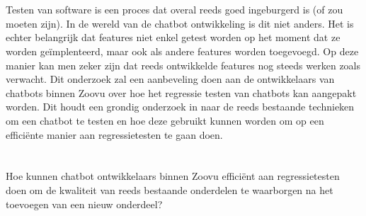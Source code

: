 \section{}
\label{sec:probleemstelling}


Testen van software is een proces dat overal reeds goed ingeburgerd is (of zou moeten zijn). In de wereld van de chatbot ontwikkeling is dit niet anders. Het is echter belangrijk dat features niet enkel getest worden op het moment dat ze worden geïmplenteerd, maar ook als andere features worden toegevoegd. Op deze manier kan men zeker zijn dat reeds ontwikkelde features nog steeds werken zoals verwacht. Dit onderzoek zal een aanbeveling doen aan de ontwikkelaars van chatbots binnen Zoovu over hoe het regressie testen van chatbots kan aangepakt worden. Dit houdt een grondig onderzoek in naar de reeds bestaande technieken om een chatbot te testen en hoe deze gebruikt kunnen worden om op een efficiënte manier aan regressietesten te gaan doen. 

\section{}
\label{sec:onderzoeksvraag}


Hoe kunnen chatbot ontwikkelaars binnen Zoovu efficiënt aan regressietesten doen om de kwaliteit van reeds bestaande onderdelen te waarborgen na het toevoegen van een nieuw onderdeel?

